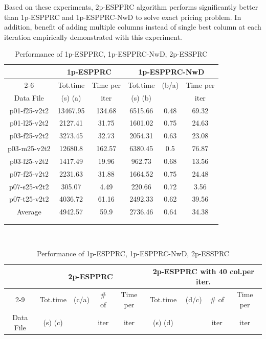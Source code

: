 Based on these experiments, 2p-ESPPRC algorithm performs significantly better than 1p-ESPPRC
and 1p-ESPPRC-NwD to solve exact pricing problem. In addition, benefit of adding multiple columns
instead of single best column at each iteration  empirically demonstrated with this experiment.
\begin{table}[h]
\centering
\caption{Performance of 1p-ESPPRC, 1p-ESPPRC-NwD, 2p-ESSPRC}\label{compexp-comp-pri1}
\begin {tabular}[t]{|c|c|c|c|c|c|}
\hline
\mbox{} & \multicolumn{2}{|c|}{1p-ESPPRC} & \multicolumn{3}{|c|}{1p-ESPPRC-NwD} \\\cline {2-6}
\mbox{} &  Tot.time  & Time per    & Tot.time  & (b/a)   & Time per    \\
Data File & (s) (a)& iter        & (s) (b) &         & iter \\\hline
p01-f25-v2t2  & 13467.95&   134.68  &   6515.66 &   0.48    &   69.32 \\
p01-l25-v2t2  & 2127.41 &   31.75   &   1601.02 &   0.75    &   24.63 \\
p03-f25-v2t2  & 3273.45 &   32.73   &   2054.31 &   0.63    &   23.08  \\
p03-m25-v2t2  & 12680.8 &   162.57  &   6380.45 &   0.5 &   76.87 \\
p03-l25-v2t2  & 1417.49 &   19.96   &   962.73  &   0.68    &   13.56 \\
p07-f25-v2t2  & 2231.63 &   31.88   &   1664.52 &   0.75    &   24.48 \\
p07-s25-v2t2  & 305.07  &   4.49    &   220.66  &   0.72    &   3.56 \\
p07-t25-v2t2  & 4036.72 &   61.16   &   2492.33 &   0.62    &   39.56 \\\hline
Average       & 4942.57 &   59.9    &   2736.46 &   0.64    &   34.38 \\\hline
\multicolumn{6}{c}{\mbox{}}\\
\multicolumn{6}{c}{\mbox{}}\\
\end{tabular}
\\
\begin {tabular}[t]{|c|c|c|c|c|c|c|c|c|}
\hline
\mbox{} & \multicolumn{4}{|c|}{2p-ESPPRC} & \multicolumn{4}{|c|}{2p-ESPPRC with 40 col.per iter.} \\\cline {2-9}
\mbox{} &  Tot.time   & (c/a)  & \# of & Time per    & Tot.time  & (d/c)  & \# of & Time per \\
Data File & (s) (c) &        & iter  & iter        & (s) (d) &        & iter  & iter \\\hline

\end{tabular}
\end{table}
